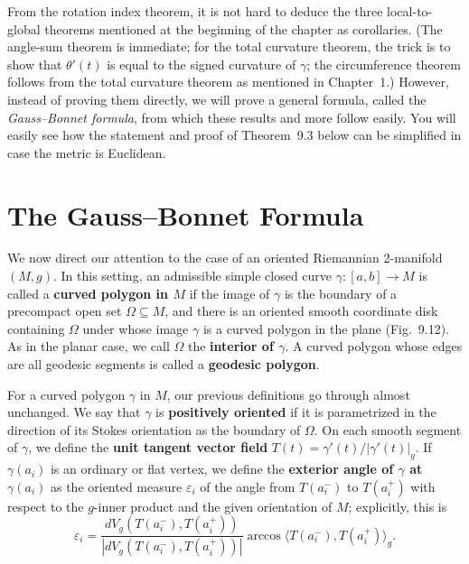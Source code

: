 From the rotation index theorem, it is not hard to deduce the three local-to-global theorems mentioned at the beginning of the chapter as corollaries. (The angle-sum theorem is immediate; for the total curvature theorem, the trick is to show that $\theta'(t)$ is equal to the signed curvature of $\gamma$; the circumference theorem follows from the total curvature theorem as mentioned in Chapter~1.) However, instead of proving them directly, we will prove a general formula, called the \emph{Gauss--Bonnet formula}, from which these results and more follow easily. You will easily see how the statement and proof of Theorem~9.3 below can be simplified in case the metric is Euclidean.


\section{The Gauss--Bonnet Formula}

We now direct our attention to the case of an oriented Riemannian 2-manifold $(M,g)$. In this setting, an admissible simple closed curve $\gamma : [a,b] \to M$ is called a \textbf{curved polygon in $M$} if the image of $\gamma$ is the boundary of a precompact open set $\Omega \subseteq M$, and there is an oriented smooth coordinate disk containing $\Omega$ under whose image $\gamma$ is a curved polygon in the plane (Fig.~9.12). As in the planar case, we call $\Omega$ the \textbf{interior of $\gamma$}. A curved polygon whose edges are all geodesic segments is called a \textbf{geodesic polygon}.

For a curved polygon $\gamma$ in $M$, our previous definitions go through almost unchanged. We say that $\gamma$ is \textbf{positively oriented} if it is parametrized in the direction of its Stokes orientation as the boundary of $\Omega$. On each smooth segment of $\gamma$, we define the \textbf{unit tangent vector field} $T(t) = \gamma'(t)/|\gamma'(t)|_g$. If $\gamma(a_i)$ is an ordinary or flat vertex, we define the \textbf{exterior angle of $\gamma$ at $\gamma(a_i)$} as the oriented measure $\varepsilon_i$ of the angle from $T(a_i^-)$ to $T(a_i^+)$ with respect to the $g$-inner product and the given orientation of $M$; explicitly, this is
\begin{equation}
\varepsilon_i = \frac{dV_g(T(a_i^-), T(a_i^+))}{|dV_g(T(a_i^-), T(a_i^+))|} \arccos\langle T(a_i^-), T(a_i^+) \rangle_g.
\tag{9.4}
\end{equation}

